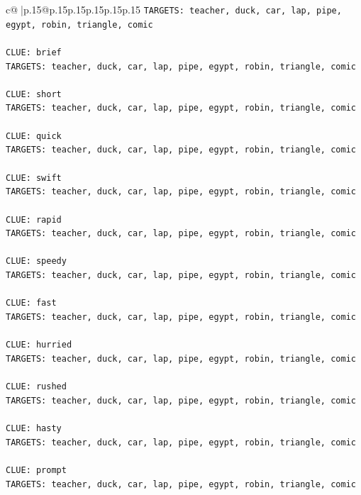 \documentclass{article}
\begin{document}
{\begin{supertabular}{c@{$\;$}|p{.15\linewidth}@{}p{.15\linewidth}p{.15\linewidth}p{.15\linewidth}p{.15\linewidth}p{.15\linewidth}}
{{{\texttt{TARGETS: teacher, duck, car, lap, pipe, egypt, robin, triangle, comic} \\
\\ 
\texttt{CLUE: brief} \\
\texttt{TARGETS: teacher, duck, car, lap, pipe, egypt, robin, triangle, comic} \\
\\ 
\texttt{CLUE: short} \\
\texttt{TARGETS: teacher, duck, car, lap, pipe, egypt, robin, triangle, comic} \\
\\ 
\texttt{CLUE: quick} \\
\texttt{TARGETS: teacher, duck, car, lap, pipe, egypt, robin, triangle, comic} \\
\\ 
\texttt{CLUE: swift} \\
\texttt{TARGETS: teacher, duck, car, lap, pipe, egypt, robin, triangle, comic} \\
\\ 
\texttt{CLUE: rapid} \\
\texttt{TARGETS: teacher, duck, car, lap, pipe, egypt, robin, triangle, comic} \\
\\ 
\texttt{CLUE: speedy} \\
\texttt{TARGETS: teacher, duck, car, lap, pipe, egypt, robin, triangle, comic} \\
\\ 
\texttt{CLUE: fast} \\
\texttt{TARGETS: teacher, duck, car, lap, pipe, egypt, robin, triangle, comic} \\
\\ 
\texttt{CLUE: hurried} \\
\texttt{TARGETS: teacher, duck, car, lap, pipe, egypt, robin, triangle, comic} \\
\\ 
\texttt{CLUE: rushed} \\
\texttt{TARGETS: teacher, duck, car, lap, pipe, egypt, robin, triangle, comic} \\
\\ 
\texttt{CLUE: hasty} \\
\texttt{TARGETS: teacher, duck, car, lap, pipe, egypt, robin, triangle, comic} \\
\\ 
\texttt{CLUE: prompt} \\
\texttt{TARGETS: teacher, duck, car, lap, pipe, egypt, robin, triangle, comic} \\
}}}
\end{supertabular}}
\end{document}
